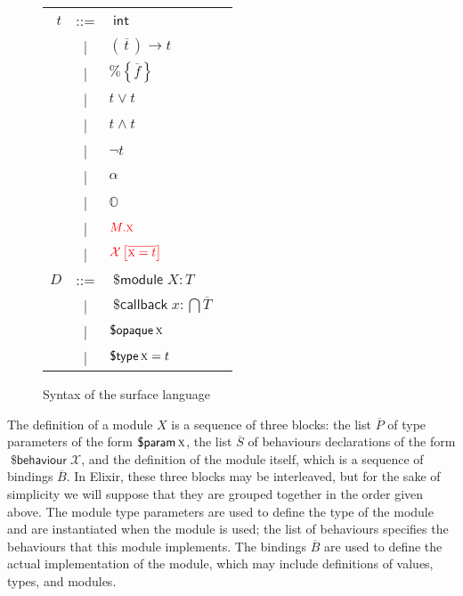 \documentclass[a4paper,10pt]{article}
\DeclareMathOperator{\kwbvr}{\textsf{\$behaviour}}
\DeclareMathOperator{\kwprm}{\textsf{\$param}}
\DeclareMathOperator{\kwopq}{\textsf{\$opaque}}
\DeclareMathOperator{\kwtp}{\textsf{\$type}}
\DeclareMathOperator{\kwmdl}{\textsf{\$module}}
\DeclareMathOperator{\kwclbk}{\textsf{\$callback}}
\DeclareMathOperator{\kwint}{\textsf{int}}
\newcommand{\tx}{\textsc{x}}
\begin{document}
\begin{figure}
\begin{tabular}{r c ll}
    $t$ & ::= & $\kwint$ \\
    & | & $(\overline{\,t\,})\rightarrow t$\\
    & | & $\texttt{\%}\!\left\{\overline{f}\right\}$ \\
    & | & $t\vee t$ \\
    & | & $t\wedge t$ \\
    & | & $\neg t$\\
    & | & $\alpha$ \\
    & | & $\mathbb{O}$ \\
    & | & $\textcolor{red}{M.\tx}$ \\
    & | & $\textcolor{red}{\mathcal{X}\left[\overline{\tx=t}\right]}$ \\
    $D$ & ::= & $\kwmdl X : T$ \\
    & | & $\kwclbk x : \bigcap \overline{T}$ \\
    & | & $\kwopq \tx$ \\
    & | & $\kwtp \tx = t$
  \end{tabular}
  \caption{Syntax of the surface language}\label{fig:surfacesyntax}
\end{figure}


The definition of a module $X$ is a sequence of three blocks: the list $\overline P$ of type parameters of the form $\kwprm \tx$, the list $\overline S$ of behaviours declarations of the form  $\kwbvr \mathcal X$, and the definition of the module itself, which is a sequence of bindings $\overline{B}$. In Elixir, these three blocks may be interleaved, but for the sake of simplicity we will suppose that they are grouped together in the order given above. The module type parameters are used to define the type of the module and are instantiated when the module is used; the list of behaviours specifies the behaviours that this module implements. The bindings $\overline{B}$ are used to define the actual implementation of the module, which may include definitions of values, types, and modules.
\end{document}
